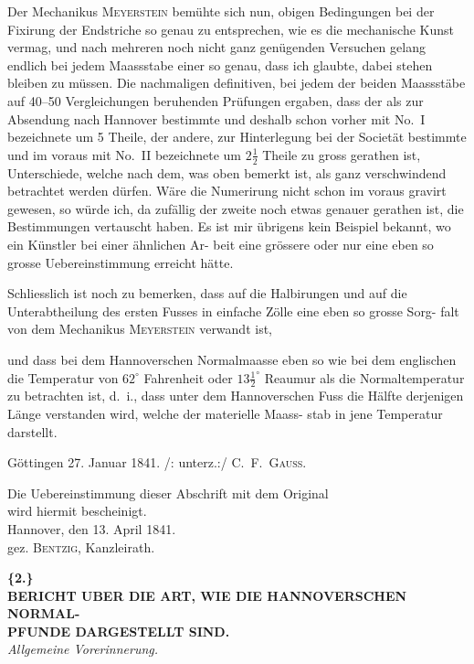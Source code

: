 \documentclass[12pt,a4paper]{article}
\theoremstyle{plain}
\theoremstyle{definition}
\theoremstyle{remark}
\begin{document}
Der Mechanikus \textsc{Meyerstein} bem\"uhte sich nun, obigen Bedingungen bei
der Fixirung der Endstriche so genau zu entsprechen, wie es die mechanische
Kunst vermag, und nach mehreren noch nicht ganz gen\"ugenden Versuchen
gelang endlich bei jedem Maassstabe einer so genau, dass ich glaubte, dabei
stehen bleiben zu m\"ussen. Die nachmaligen definitiven, bei jedem der beiden
Maassst\"abe auf 40--50 Vergleichungen beruhenden Pr\"ufungen ergaben, dass
der als zur Absendung nach Hannover bestimmte und deshalb schon vorher
mit No.~I bezeichnete um 5 Theile, der andere, zur Hinterlegung bei der
Societ\"at bestimmte und im voraus mit No.~II bezeichnete um $2\frac{1}{2}$ Theile
zu gross gerathen ist, Unterschiede, welche nach dem, was oben bemerkt
ist, als ganz verschwindend betrachtet werden d\"urfen. W\"are die Numerirung
nicht schon im voraus gravirt gewesen, so w\"urde ich, da zuf\"allig der zweite
noch etwas genauer gerathen ist, die Bestimmungen vertauscht haben. Es ist
mir \"ubrigens kein Beispiel bekannt, wo ein K\"unstler bei einer \"ahnlichen Ar-
beit eine gr\"ossere oder nur eine eben so grosse Uebereinstimmung erreicht
h\"atte.

Schliesslich ist noch zu bemerken, dass auf die Halbirungen und auf die
Unterabtheilung des ersten Fusses in einfache Z\"olle eine eben so grosse Sorg-
falt von dem Mechanikus \textsc{Meyerstein} verwandt ist,

und dass bei dem Hannoverschen Normalmaasse eben so wie bei dem
englischen die Temperatur von $62^{\circ}$ Fahrenheit oder $13\frac{1}{2}^{\circ}$ Reaumur als die
Normaltemperatur zu betrachten ist, d.~i., dass unter dem Hannoverschen Fuss
die H\"alfte derjenigen L\"ange verstanden wird, welche der materielle Maass-
stab in jene Temperatur darstellt.

\begin{flushright}
G\"ottingen 27. Januar 1841. /: unterz.:/ \textsc{C.~F.~Gauss.}
\end{flushright}

\vspace{0.3cm}
\noindent Die Uebereinstimmung dieser Abschrift mit dem Original\\
wird hiermit bescheinigt.\\
Hannover, den 13. April 1841.\\
gez. \textsc{Bentzig}, Kanzleirath.

\newpage


\noindent\textbf{\{2.\}}\\
\textbf{BERICHT UBER DIE ART, WIE DIE HANNOVERSCHEN NORMAL-\\
PFUNDE DARGESTELLT SIND.}\\
\textit{Allgemeine Vorerinnerung.}
\end{document}
